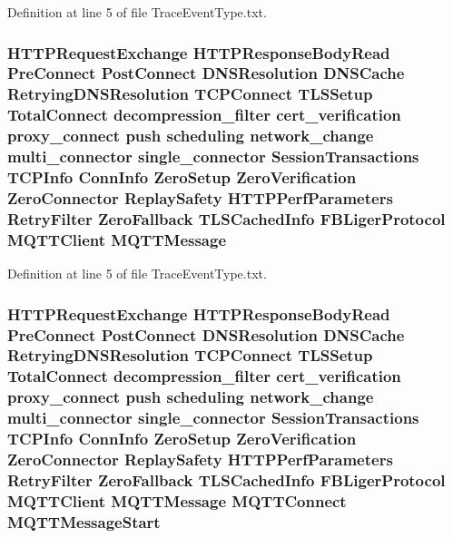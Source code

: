Definition at line 5 of file Trace\+Event\+Type.\+txt.

\subsubsection[{M\+Q\+T\+T\+Message}]{ H\+T\+T\+P\+Request\+Exchange H\+T\+T\+P\+Response\+Body\+Read {\bf Pre\+Connect} {\bf Post\+Connect} D\+N\+S\+Resolution D\+N\+S\+Cache Retrying\+D\+N\+S\+Resolution T\+C\+P\+Connect T\+L\+S\+Setup {\bf Total\+Connect} decompression\+\_\+filter cert\+\_\+verification proxy\+\_\+connect push scheduling network\+\_\+change multi\+\_\+connector single\+\_\+connector {\bf Session\+Transactions} {\bf T\+C\+P\+Info} {\bf Conn\+Info} {\bf Zero\+Setup} {\bf Zero\+Verification} {\bf Zero\+Connector} {\bf Replay\+Safety} {\bf H\+T\+T\+P\+Perf\+Parameters} {\bf Retry\+Filter} {\bf Zero\+Fallback} {\bf T\+L\+S\+Cached\+Info} {\bf F\+B\+Liger\+Protocol} {\bf M\+Q\+T\+T\+Client} M\+Q\+T\+T\+Message}\label{TraceEventType_8txt_a0d7c551d6a21bb8a187dfd3fc68adcc8}


Definition at line 5 of file Trace\+Event\+Type.\+txt.

\subsubsection[{M\+Q\+T\+T\+Message\+Start}]{ H\+T\+T\+P\+Request\+Exchange H\+T\+T\+P\+Response\+Body\+Read {\bf Pre\+Connect} {\bf Post\+Connect} D\+N\+S\+Resolution D\+N\+S\+Cache Retrying\+D\+N\+S\+Resolution T\+C\+P\+Connect T\+L\+S\+Setup {\bf Total\+Connect} decompression\+\_\+filter cert\+\_\+verification proxy\+\_\+connect push scheduling network\+\_\+change multi\+\_\+connector single\+\_\+connector {\bf Session\+Transactions} {\bf T\+C\+P\+Info} {\bf Conn\+Info} {\bf Zero\+Setup} {\bf Zero\+Verification} {\bf Zero\+Connector} {\bf Replay\+Safety} {\bf H\+T\+T\+P\+Perf\+Parameters} {\bf Retry\+Filter} {\bf Zero\+Fallback} {\bf T\+L\+S\+Cached\+Info} {\bf F\+B\+Liger\+Protocol} {\bf M\+Q\+T\+T\+Client} {\bf M\+Q\+T\+T\+Message} {\bf M\+Q\+T\+T\+Connect} M\+Q\+T\+T\+Message\+Start}\label{TraceEventType_8txt_af79834eeb4b19b9f8d1224f8afe0fa55}


